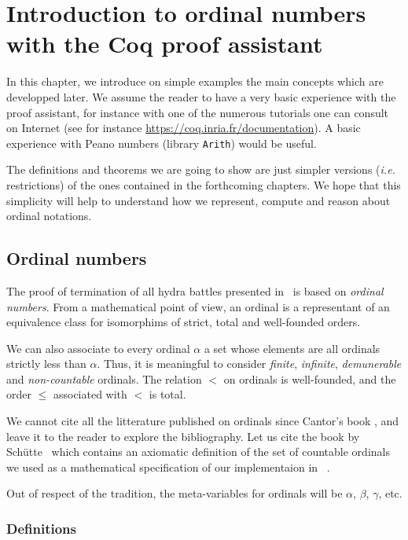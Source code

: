 \chapter{Introduction to ordinal numbers with the Coq proof assistant}

In this chapter, we introduce on  simple examples the main concepts which are developped later.  We assume the reader to have a very basic experience with the \coq{} proof assistant, for instance with one of the numerous tutorials one can consult on Internet
(see for instance \url{https://coq.inria.fr/documentation}). A basic experience  with Peano numbers (library \texttt{Arith}) would be useful.

The definitions  and theorems we are going to show are just simpler versions (\emph{i.e.} restrictions) of the ones contained in the forthcoming chapters. We hope that this simplicity will help to understand how we represent, compute and reason about ordinal notations.



\section{Ordinal numbers}

The proof of termination of all hydra battles presented in~\cite{KP82} is based
on \emph{ordinal numbers}.
From a mathematical point of view, an ordinal is a representant of an equivalence class for isomorphims of strict, total and well-founded orders.

We can also associate to every ordinal $\alpha$ a set whose elements are all ordinals strictly less than $\alpha$. Thus, it is meaningful  to consider \emph{finite}, \emph{infinite}, \emph{demunerable} and \emph{non-countable} ordinals.
The relation $<$ on ordinals is well-founded, and the order $\leq$ associated with
$<$ is total.

We cannot cite all the litterature published on ordinals since Cantor's book 
\cite{cantorbook}, and 
leave it to the reader to explore the bibliography. Let us cite the book by Schütte~\cite{schutte} which contains an axiomatic definition of the set of countable ordinals we used as a mathematical specification of our implementaion in \coq{}~\cite{CantorContrib}. 


Out of respect of the tradition, the meta-variables for ordinals will be 
 $\alpha$, $\beta$, $\gamma$, etc. 

\subsection{Definitions}

